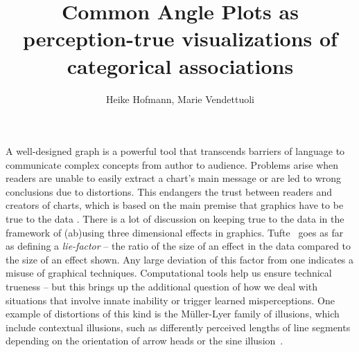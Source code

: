 \documentclass[journal]{vgtc}\usepackage{graphicx, color}
\title{Common Angle Plots as perception-true visualizations of categorical associations}
\author{Heike Hofmann, Marie Vendettuoli}
\begin{document}


\maketitle



% 
% 
% 
% 
A well-designed graph is a powerful tool 
that transcends barriers of language to
communicate complex concepts from author to audience. 
Problems arise when readers are unable to easily extract a chart's main message or are led to wrong conclusions due to distortions.
This endangers the trust between readers and creators of charts, which is based on the main premise that
graphics have to be true to the data \citep{tufte, wainer:2000, robbins:2005}.
There is a lot of discussion on keeping true to the data in the framework of (ab)using three dimensional effects in graphics. Tufte~\citep{tufte} goes as far as defining a {\it lie-factor} -- the ratio of the size of an effect in the data compared to the size of an effect shown. Any large deviation of this factor from one indicates a misuse of graphical techniques. Computational tools help us ensure technical trueness -- but this brings up the additional question of how we deal with situations that involve innate inability or trigger learned misperceptions.
One example of distortions of this kind is the 
 M\"{u}ller-Lyer family of illusions, which include contextual illusions,  such as differently perceived lengths of line segments depending on the orientation of arrow heads  
 or the sine illusion~\citep{day:1991}.
\end{document}
